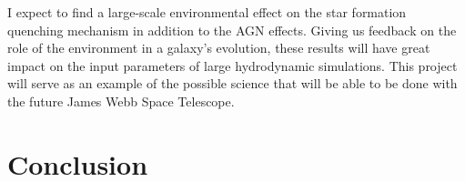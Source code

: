 I expect to find a large-scale environmental effect on the star formation 
quenching mechanism in addition to the AGN effects.  Giving us feedback on the 
role of the environment in a galaxy's evolution, these results will have great 
impact on the input parameters of large hydrodynamic simulations.  This project 
will serve as an example of the possible science that will be able to be done 
with the future James Webb Space Telescope.





\section[Conclusion]{Conclusion}
